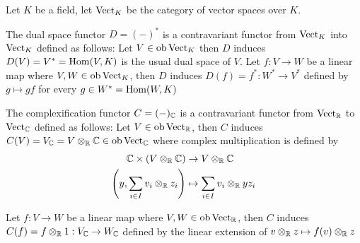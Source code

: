 Let $K$ be a field, let $\Vect_K$ be the category of vector spaces over $K$.

\begin{definition}
	The dual space functor $D = (-)^*$ is a contravariant functor from $\Vect_K$ into $\Vect_K$ defined as follows: Let $V \in \ob \Vect_K$ then $D$ induces $D(V) = V^* = \Hom(V, K)$ is the usual dual space of $V$. Let $f: V \to W$ be a linear map where $V, W \in \ob \Vect_K$, then $D$ induces $D(f) = f^*: W^* \to V^*$ defined by $g \mapsto gf$ for every $g \in W^* = \Hom(W, K)$
	\begin{center}
	\end{center}
\end{definition}

\begin{definition}
	The complexification functor $C = (-)_\C$ is a contravariant functor from $\Vect_\R$ to $\Vect_\C$ defined as follows: Let $V \in \ob \Vect_\R$, then $C$ induces $C(V) = V_\C = V \otimes_\R \C \in \ob \Vect_\C$ where complex multiplication is defined by
	\begin{align*}
		\C \times (V \otimes_\R \C) &\to V \otimes_\R \C \\
		\tuple*{y, \sum_{i \in I} v_i \otimes_\R z_i} &\mapsto \sum_{i \in I} v_i \otimes_\R y z_i
	\end{align*}
	
	Let $f: V \to W$ be a linear map where $V, W \in \ob \Vect_\R$, then $C$ induces $C(f) = f \otimes_\R 1: V_\C \to W_\C$ defined by the linear extension of $v \otimes_\R z \mapsto f(v) \otimes_\R z$
\end{definition}

